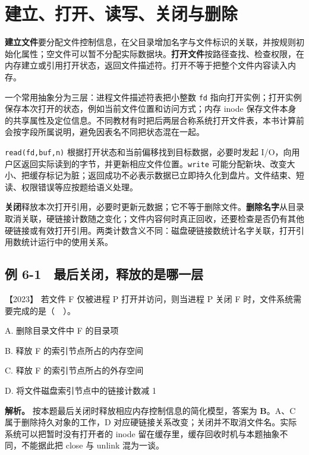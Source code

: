 \section{建立、打开、读写、关闭与删除}\label{os-6-2}

\textbf{建立文件}要分配文件控制信息，在父目录增加名字与文件标识的关联，并按规则初始化属性；空文件可以暂不分配实际数据块。\textbf{打开文件}按路径查找、检查权限，在内存建立或引用打开状态，返回文件描述符。打开不等于把整个文件内容读入内存。

一个常用抽象分为三层：进程文件描述符表把小整数 \allowbreak{}\texttt{fd} 指向打开实例；打开实例保存本次打开的状态，例如当前文件位置和访问方式；内存 inode 保存文件本身的共享属性及定位信息。不同教材有时把后两层合称系统打开文件表，本书计算前会按字段所属说明，避免因表名不同把状态混在一起。

\allowbreak{}\texttt{read(fd,}\allowbreak{}\texttt{buf,}\allowbreak{}\texttt{n)} 根据打开状态和当前偏移找到目标数据，必要时发起 I/O，向用户区返回实际读到的字节，并更新相应文件位置。\allowbreak{}\texttt{write} 可能分配新块、改变大小、把缓存标记为脏；返回成功不必表示数据已立即持久化到盘片。文件结束、短读、权限错误等应按题给语义处理。

\textbf{关闭}释放本次打开引用，必要时更新元数据；它不等于删除文件。\textbf{删除名字}从目录取消关联，硬链接计数随之变化；文件内容何时真正回收，还要检查是否仍有其他硬链接或有效打开引用。两类计数含义不同：磁盘硬链接数统计名字关联，打开引用数统计运行中的使用关系。

\subsection{例 6-1　最后关闭，释放的是哪一层}\label{os-ex6-1}

\noindent{}【2023】 若文件 F 仅被进程 P 打开并访问，则当进程 P 关闭 F 时，文件系统需要完成的是（　）。

A. 删除目录文件中 F 的目录项

B. 释放 F 的索引节点所占的内存空间

C. 释放 F 的索引节点所占的外存空间

D. 将文件磁盘索引节点中的链接计数减 1


\textbf{解析。} 按本题最后关闭时释放相应内存控制信息的简化模型，答案为 \textbf{B}。A、C 属于删除持久对象的工作，D 对应硬链接关系改变；关闭并不取消文件名。实际系统可以把暂时没有打开者的 inode 留在缓存里，缓存回收时机与本题抽象不同，不能据此把 close 与 unlink 混为一谈。

